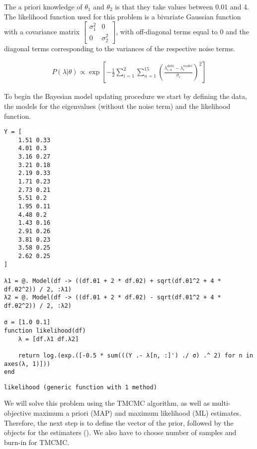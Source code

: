 The a priori knowledge of \(\theta_1\) and \(\theta_2\) is that they take values between 0.01 and 4. The likelihood function used for this problem is a bivariate Gaussian function with a covariance matrix \(\begin{bmatrix} \sigma_1^2 & 0 \\ 0 & \sigma_2^2 \end{bmatrix}\), with off-diagonal terms equal to 0 and the diagonal terms corresponding to the variances of the respective noise terms.



\begin{equation*}
\begin{split}P(\lambda|\theta) \propto \exp \left[-\frac{1}{2}\sum_{i=1}^2\sum_{n=1}^{15} {\left(\frac{\lambda_{i,n}^{data}-\lambda_i^{model}}{\sigma_i}\right)}^2\right]\end{split}\end{equation*}


To begin the Bayesian model updating procedure we start by defining the data, the models for the eigenvalues (without the noise term) and the likelihood function.




\begin{verbatim}
Y = [
    1.51 0.33
    4.01 0.3
    3.16 0.27
    3.21 0.18
    2.19 0.33
    1.71 0.23
    2.73 0.21
    5.51 0.2
    1.95 0.11
    4.48 0.2
    1.43 0.16
    2.91 0.26
    3.81 0.23
    3.58 0.25
    2.62 0.25
]

λ1 = @. Model(df -> ((df.θ1 + 2 * df.θ2) + sqrt(df.θ1^2 + 4 * df.θ2^2)) / 2, :λ1)
λ2 = @. Model(df -> ((df.θ1 + 2 * df.θ2) - sqrt(df.θ1^2 + 4 * df.θ2^2)) / 2, :λ2)

σ = [1.0 0.1]
function likelihood(df)
    λ = [df.λ1 df.λ2]

    return log.(exp.([-0.5 * sum(((Y .- λ[n, :]') ./ σ) .^ 2) for n in axes(λ, 1)]))
end
\end{verbatim}


\begin{verbatim}
likelihood (generic function with 1 method)
\end{verbatim}



We will solve this problem using the TMCMC algorithm, as well as multi-objective maximum a priori (MAP) and maximum likelihood (ML) estimates. Therefore, the next step is to define the  vector of the prior, followed by the objects for the estimaters (). We also have to choose number of samples and burn-in for TMCMC.




